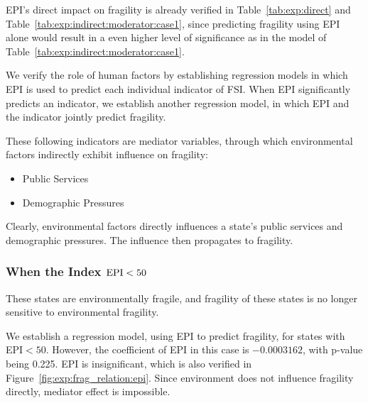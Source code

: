 EPI's direct impact on fragility is already verified in Table~\ref{tab:exp:direct} and Table~\ref{tab:exp:indirect:moderator:case1}, since predicting fragility using EPI alone would result in a even higher level of significance as in the model of Table~\ref{tab:exp:indirect:moderator:case1}.

We verify the role of human factors by establishing regression models in which EPI is used to predict each individual indicator of FSI. When EPI significantly predicts an indicator, we establish another regression model, in which EPI and the indicator jointly predict fragility. 

These following indicators are mediator variables, through which environmental factors indirectly exhibit influence on fragility:
\begin{itemize}
   \item Public Services
   \item Demographic Pressures
\end{itemize}
Clearly, environmental factors directly influences a state's public services and demographic pressures. The influence then propagates to fragility.

\subsubsection{When the Index $\rm{EPI} < 50$}
These states are environmentally fragile, and fragility of these states is no longer sensitive to environmental fragility.

We establish a regression model, using EPI to predict fragility, for states with EPI$<50$. 
However, the coefficient of EPI in this case is $ -0.0003162 $, with p-value being 0.225. EPI is insignificant, which is also verified in Figure~\ref{fig:exp:frag_relation:epi}. Since environment does not influence fragility directly, mediator effect is impossible.

